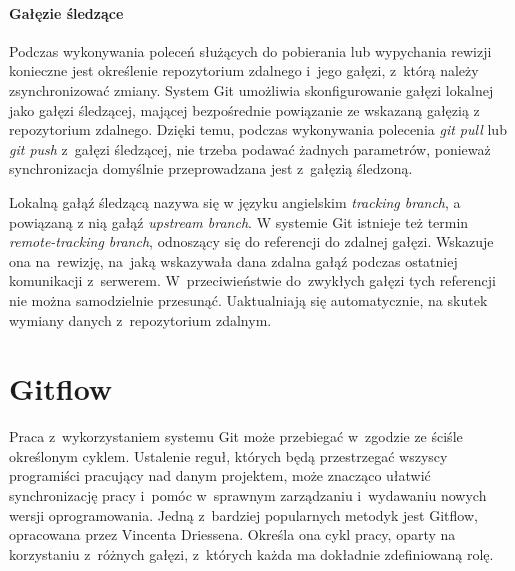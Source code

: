 \documentclass[12pt,a4paper,polish,thesis]{dcsbook}
\begin{document}
{	\paragraph{Gałęzie śledzące}
	Podczas wykonywania poleceń służących do pobierania lub wypychania rewizji konieczne jest określenie repozytorium zdalnego i~jego gałęzi, z~którą należy zsynchronizować zmiany. System Git umożliwia skonfigurowanie gałęzi lokalnej jako gałęzi śledzącej, mającej bezpośrednie powiązanie ze wskazaną gałęzią z repozytorium zdalnego. Dzięki temu, podczas wykonywania polecenia \textit{git pull} lub \textit{git push} z~gałęzi śledzącej, nie trzeba podawać żadnych parametrów, ponieważ synchronizacja domyślnie przeprowadzana jest z~gałęzią śledzoną.

	Lokalną gałąź śledzącą nazywa się w języku angielskim \textit{tracking branch}, a powiązaną z nią gałąź \textit{upstream branch}. W systemie Git istnieje też termin \textit{remote-tracking branch}, odnoszący się do referencji do zdalnej gałęzi. Wskazuje ona na~rewizję, na~jaką wskazywała dana zdalna gałąź podczas ostatniej komunikacji z~serwerem. W~przeciwieństwie do~zwykłych gałęzi tych referencji nie można samodzielnie przesunąć. Uaktualniają się automatycznie, na skutek wymiany danych z~repozytorium zdalnym.

	\section{Gitflow}

	Praca z~wykorzystaniem systemu Git może przebiegać w~zgodzie ze ściśle określonym cyklem. Ustalenie reguł, których będą przestrzegać wszyscy programiści pracujący nad danym projektem, może znacząco ułatwić synchronizację pracy i~pomóc w~sprawnym zarządzaniu i~wydawaniu nowych wersji oprogramowania. Jedną z~bardziej popularnych metodyk jest Gitflow, opracowana przez Vincenta Driessena. Określa ona cykl pracy, oparty na korzystaniu z~różnych gałęzi, z~których każda ma dokładnie zdefiniowaną rolę.

}
\end{document}
